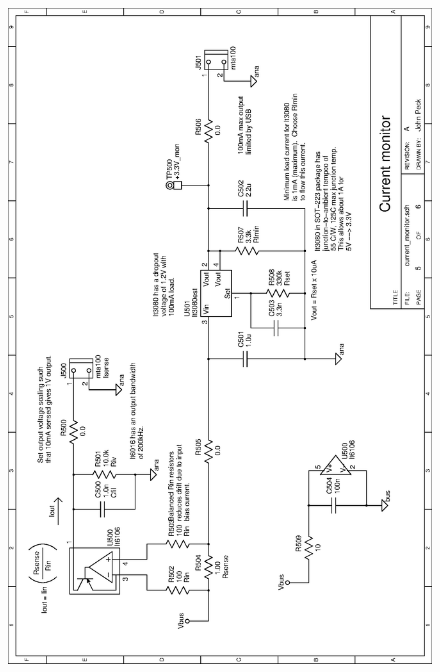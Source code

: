 \begin{figure}[ht]
    \begin{center}
          \vspace{0.4cm}
          \includegraphics[clip,height=\textheight]
          {schematics/usb/current_monitor}
          \label{sch:current_monitor}
    \end{center} 
\end{figure}

